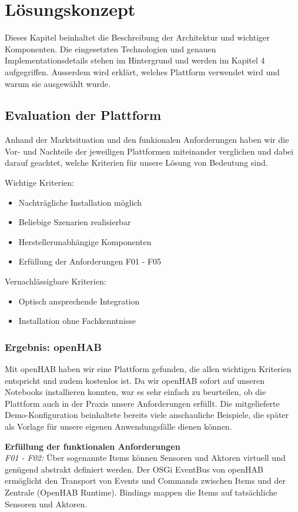 \section{Lösungskonzept}
Dieses Kapitel beinhaltet die Beschreibung der Architektur und wichtiger Komponenten. Die eingesetzten Technologien und genauen Implementationsdetails stehen im Hintergrund und werden im Kapitel 4 aufgegriffen. Ausserdem wird erklärt, welches Plattform verwendet wird und warum sie ausgewählt wurde.

\subsection{Evaluation der Plattform}
Anhand der Marktsituation und den funkionalen Anforderungen haben wir die Vor- und Nachteile der jeweiligen Plattformen miteinander verglichen und dabei darauf geachtet, welche Kriterien für unsere Lösung von Bedeutung sind.

Wichtige Kriterien:
\begin{itemize}
	\item Nachträgliche Installation möglich
	\item Beliebige Szenarien realisierbar
	\item Herstellerunabhängige Komponenten
	\item Erfüllung der Anforderungen F01 - F05
\end{itemize}

Vernachlässigbare Kriterien:
\begin{itemize}
	\item Optisch ansprechende Integration
	\item Installation ohne Fachkenntnisse
\end{itemize}

\subsubsection{Ergebnis: openHAB} 
Mit openHAB haben wir eine Plattform gefunden, die allen wichtigen Kriterien entspricht und zudem kostenlos ist. Da wir openHAB sofort auf unseren Notebooks installieren konnten, war es sehr einfach zu beurteilen, ob die Plattform auch in der Praxis unsere Anforderungen erfüllt. Die mitgelieferte Demo-Konfiguration beinhaltete bereits viele anschauliche Beispiele, die später als Vorlage für unsere eigenen Anwendungsfälle dienen können. 

\textbf{Erfüllung der funktionalen Anforderungen} \\
\textit{F01 - F02:} Über sogenannte Items können Sensoren und Aktoren virtuell und genügend abstrakt definiert werden. Der OSGi EventBus von openHAB ermöglicht den Transport von Events und Commands zwischen Items und der Zentrale (OpenHAB Runtime). Bindings mappen die Items auf tatsächliche Sensoren und Aktoren.

